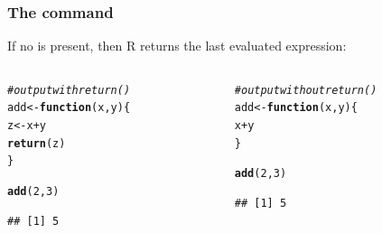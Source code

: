\documentclass[12pt]{beamer}\usepackage[]{graphicx}\usepackage[]{color}
\makeatletter
\newcommand{\hlnum}[1]{\textcolor[rgb]{0.686,0.059,0.569}{#1}}%
\newcommand{\hlcom}[1]{\textcolor[rgb]{0.678,0.584,0.686}{\textit{#1}}}%
\newcommand{\hlopt}[1]{\textcolor[rgb]{0,0,0}{#1}}%
\newcommand{\hlstd}[1]{\textcolor[rgb]{0.345,0.345,0.345}{#1}}%
\newcommand{\hlkwa}[1]{\textcolor[rgb]{0.161,0.373,0.58}{\textbf{#1}}}%
\newcommand{\hlkwb}[1]{\textcolor[rgb]{0.69,0.353,0.396}{#1}}%
\newcommand{\hlkwc}[1]{\textcolor[rgb]{0.333,0.667,0.333}{#1}}%
\newcommand{\hlkwd}[1]{\textcolor[rgb]{0.737,0.353,0.396}{\textbf{#1}}}%
\newenvironment{kframe}{%
 \def\at@end@of@kframe{}%
 \ifinner\ifhmode%
  \def\at@end@of@kframe{\end{minipage}}%
  \begin{minipage}{\columnwidth}%
 \fi\fi%
 \def\FrameCommand##1{\hskip\@totalleftmargin \hskip-\fboxsep
 \colorbox{shadecolor}{##1}\hskip-\fboxsep
     \hskip-\linewidth \hskip-\@totalleftmargin \hskip\columnwidth}%
 \MakeFramed {\advance\hsize-\width
   \@totalleftmargin\z@ \linewidth\hsize
   \@setminipage}}%
 {\par\unskip\endMakeFramed%
 \at@end@of@kframe}
\newenvironment{knitrout}{}{} %
\makeatother
\begin{document}
\begin{frame}[fragile]
\frametitle{The  command}

If no  is present, then R returns the last evaluated expression:

\begin{columns}[t]
\begin{column}{0.45\textwidth}

\begin{knitrout}\footnotesize
{}\color{fgcolor}\begin{kframe}
\begin{alltt}
\hlcom{# output with return()}
\hlstd{add} \hlkwb{<-} \hlkwa{function}\hlstd{(}\hlkwc{x}\hlstd{,} \hlkwc{y}\hlstd{) \{}
  \hlstd{z} \hlkwb{<-} \hlstd{x} \hlopt{+} \hlstd{y}
  \hlkwd{return}\hlstd{(z)}
\hlstd{\}}

\hlkwd{add}\hlstd{(}\hlnum{2}\hlstd{,} \hlnum{3}\hlstd{)}
\end{alltt}
\begin{verbatim}
## [1] 5
\end{verbatim}
\end{kframe}
\end{knitrout}
\end{column}

\begin{column}{0.45\textwidth}
\begin{knitrout}\footnotesize
{}\color{fgcolor}\begin{kframe}
\begin{alltt}
\hlcom{# output without return()}
\hlstd{add} \hlkwb{<-} \hlkwa{function}\hlstd{(}\hlkwc{x}\hlstd{,} \hlkwc{y}\hlstd{) \{}
  \hlstd{x} \hlopt{+} \hlstd{y}
\hlstd{\}}

\hlkwd{add}\hlstd{(}\hlnum{2}\hlstd{,} \hlnum{3}\hlstd{)}
\end{alltt}
\begin{verbatim}
## [1] 5
\end{verbatim}
\end{kframe}
\end{knitrout}
\end{column}
\end{columns}

\end{frame}

\end{document}
